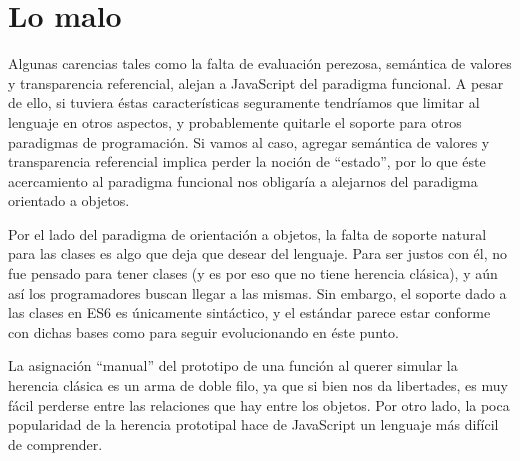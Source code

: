 \section{Lo malo}

Algunas carencias tales como la falta de evaluación perezosa, semántica de valores y transparencia referencial, alejan a JavaScript del paradigma funcional. A pesar de ello, si tuviera éstas características seguramente tendríamos que limitar al lenguaje en otros aspectos, y probablemente quitarle el soporte para otros paradigmas de programación. Si vamos al caso, agregar semántica de valores y transparencia referencial implica perder la noción de "`estado"', por lo que éste acercamiento al paradigma funcional nos obligaría a alejarnos del paradigma orientado a objetos.

Por el lado del paradigma de orientación a objetos, la falta de soporte natural para las clases es algo que deja que desear del lenguaje. Para ser justos con él, no fue pensado para tener clases (y es por eso que no tiene herencia clásica), y aún así los programadores buscan llegar a las mismas. Sin embargo, el soporte dado a las clases en ES6 es únicamente sintáctico, y el estándar parece estar conforme con dichas bases como para seguir evolucionando en éste punto. 

La asignación "`manual"' del prototipo de una función al querer simular la herencia clásica es un arma de doble filo, ya que si bien nos da libertades, es muy fácil perderse entre las relaciones que hay entre los objetos. Por otro lado, la poca popularidad de la herencia prototipal hace de JavaScript un lenguaje más difícil de comprender.